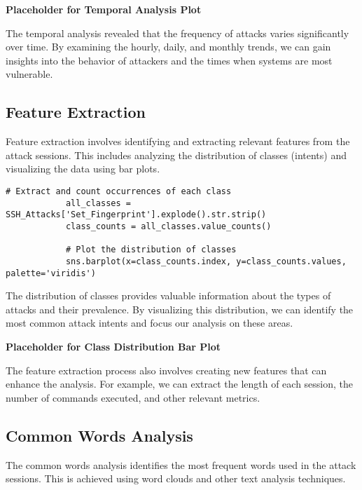         \textbf{Placeholder for Temporal Analysis Plot}

        The temporal analysis revealed that the frequency of attacks varies significantly over time. By examining the hourly, daily, and monthly trends, we can gain insights into the behavior of attackers and the times when systems are most vulnerable.

    \subsection{Feature Extraction}
    
        Feature extraction involves identifying and extracting relevant features from the attack sessions. This includes analyzing the distribution of classes (intents) and visualizing the data using bar plots.
        
        \vspace{0.5em}

        \begin{lstlisting}[caption={Extract and visualize class distribution}, label={lst:extract-visualize-classes}]
            # Extract and count occurrences of each class
            all_classes = SSH_Attacks['Set_Fingerprint'].explode().str.strip()
            class_counts = all_classes.value_counts()

            # Plot the distribution of classes
            sns.barplot(x=class_counts.index, y=class_counts.values, palette='viridis')
        \end{lstlisting}

        The distribution of classes provides valuable information about the types of attacks and their prevalence. By visualizing this distribution, we can identify the most common attack intents and focus our analysis on these areas.

        \textbf{Placeholder for Class Distribution Bar Plot}

        The feature extraction process also involves creating new features that can enhance the analysis. For example, we can extract the length of each session, the number of commands executed, and other relevant metrics.

    \subsection{Common Words Analysis}
    
        The common words analysis identifies the most frequent words used in the attack sessions. This is achieved using word clouds and other text analysis techniques.
        
